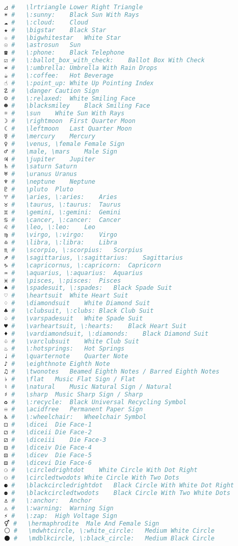 \begin{lstlisting}[language=Julia, style=julia, linewidth=\textwidth]
◿ #   \lrtriangle Lower Right Triangle
☀ #   \:sunny:    Black Sun With Rays
☁ #   \:cloud:    Cloud
★ #   \bigstar    Black Star
☆ #   \bigwhitestar   White Star
☉ #   \astrosun   Sun
☎ #   \:phone:    Black Telephone
☑ #   \:ballot_box_with_check:    Ballot Box With Check
☔ #   \:umbrella: Umbrella With Rain Drops
☕ #   \:coffee:   Hot Beverage
☝ #   \:point_up: White Up Pointing Index
☡ #   \danger Caution Sign
☺ #   \:relaxed:  White Smiling Face
☻ #   \blacksmiley    Black Smiling Face
☼ #   \sun    White Sun With Rays
☽ #   \rightmoon  First Quarter Moon
☾ #   \leftmoon   Last Quarter Moon
☿ #   \mercury    Mercury
♀ #   \venus, \female Female Sign
♂ #   \male, \mars    Male Sign
♃ #   \jupiter    Jupiter
♄ #   \saturn Saturn
♅ #   \uranus Uranus
♆ #   \neptune    Neptune
♇ #   \pluto  Pluto
♈ #   \aries, \:aries:    Aries
♉ #   \taurus, \:taurus:  Taurus
♊ #   \gemini, \:gemini:  Gemini
♋ #   \cancer, \:cancer:  Cancer
♌ #   \leo, \:leo:    Leo
♍ #   \virgo, \:virgo:    Virgo
♎ #   \libra, \:libra:    Libra
♏ #   \scorpio, \:scorpius:   Scorpius
♐ #   \sagittarius, \:sagittarius:    Sagittarius
♑ #   \capricornus, \:capricorn:  Capricorn
♒ #   \aquarius, \:aquarius:  Aquarius
♓ #   \pisces, \:pisces:  Pisces
♠ #   \spadesuit, \:spades:   Black Spade Suit
♡ #   \heartsuit  White Heart Suit
♢ #   \diamondsuit    White Diamond Suit
♣ #   \clubsuit, \:clubs: Black Club Suit
♤ #   \varspadesuit   White Spade Suit
♥ #   \varheartsuit, \:hearts:    Black Heart Suit
♦ #   \vardiamondsuit, \:diamonds:    Black Diamond Suit
♧ #   \varclubsuit    White Club Suit
♨ #   \:hotsprings:   Hot Springs
♩ #   \quarternote    Quarter Note
♪ #   \eighthnote Eighth Note
♫ #   \twonotes   Beamed Eighth Notes / Barred Eighth Notes
♭ #   \flat   Music Flat Sign / Flat
♮ #   \natural    Music Natural Sign / Natural
♯ #   \sharp  Music Sharp Sign / Sharp
♻ #   \:recycle:  Black Universal Recycling Symbol
♾ #   \acidfree   Permanent Paper Sign
♿ #   \:wheelchair:   Wheelchair Symbol
⚀ #   \dicei  Die Face-1
⚁ #   \diceii Die Face-2
⚂ #   \diceiii    Die Face-3
⚃ #   \diceiv Die Face-4
⚄ #   \dicev  Die Face-5
⚅ #   \dicevi Die Face-6
⚆ #   \circledrightdot    White Circle With Dot Right
⚇ #   \circledtwodots White Circle With Two Dots
⚈ #   \blackcircledrightdot   Black Circle With White Dot Right
⚉ #   \blackcircledtwodots    Black Circle With Two White Dots
⚓ #   \:anchor:   Anchor
⚠ #   \:warning:  Warning Sign
⚡ #   \:zap:  High Voltage Sign
⚥ #   \hermaphrodite  Male And Female Sign
⚪ #   \mdwhtcircle, \:white_circle:   Medium White Circle
⚫ #   \mdblkcircle, \:black_circle:   Medium Black Circle

\end{lstlisting}
